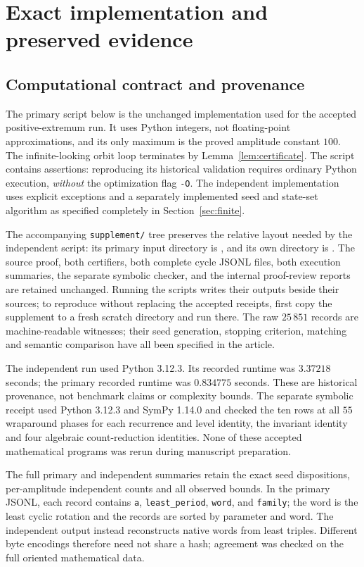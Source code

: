 \section{Exact implementation and preserved evidence}
\label{app:certificate}

\subsection{Computational contract and provenance}
The primary script below is the unchanged implementation used
for the accepted positive-extremum run. It uses Python integers,
not floating-point approximations, and its only maximum is the
proved amplitude constant $100$. The infinite-looking orbit
loop terminates by Lemma~\ref{lem:certificate}. The script
contains assertions: reproducing its historical validation
requires ordinary Python execution, \emph{without} the
optimization flag \texttt{-O}. The independent implementation
uses explicit exceptions and a separately implemented seed and
state-set algorithm as specified completely in
Section~\ref{sec:finite}.

The accompanying \texttt{supplement/} tree preserves the
relative layout needed by the independent script: its primary
input directory is , and its own
directory is .
The source proof, both certifiers, both complete cycle JSONL
files, both execution summaries, the separate symbolic checker,
and the internal proof-review reports are retained unchanged.
Running the scripts writes their outputs beside their sources;
to reproduce without replacing the accepted receipts, first
copy the supplement to a fresh scratch directory and run there.
The raw $25\,851$ records are machine-readable witnesses; their
seed generation, stopping criterion, matching and semantic
comparison have all been specified in the article.

The independent run used Python 3.12.3. Its recorded runtime
was $3.37218$ seconds; the primary recorded runtime was
$0.834775$ seconds. These are historical provenance, not
benchmark claims or complexity bounds. The separate symbolic
receipt used Python 3.12.3 and SymPy 1.14.0 and checked the
ten rows at all $55$ wraparound phases for each recurrence
and level identity, the invariant identity and four algebraic
count-reduction identities. None of these accepted mathematical
programs was rerun during manuscript preparation.

The full primary and independent summaries retain the exact
seed dispositions, per-amplitude independent counts and all
observed bounds. In the primary JSONL, each record contains
\texttt{a}, \texttt{least\_period}, \texttt{word}, and
\texttt{family}; the word is the least cyclic rotation and
the records are sorted by parameter and word. The independent
output instead reconstructs native words from least triples.
Different byte encodings therefore need not share a hash;
agreement was checked on the full oriented mathematical data.

